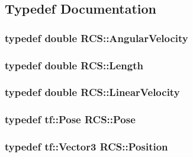 \subsection{Typedef Documentation}
\hypertarget{namespaceRCS_a3ca212cf7a0c547f5496352e850372a9}{
\subsubsection[{Angular\-Velocity}]{\setlength{\rightskip}{0pt plus 5cm}typedef double {\bf R\-C\-S\-::\-Angular\-Velocity}}}\label{namespaceRCS_a3ca212cf7a0c547f5496352e850372a9}
\hypertarget{namespaceRCS_a86ac9427c1a3f2ec2b94a74888b2cefd}{
\subsubsection[{Length}]{\setlength{\rightskip}{0pt plus 5cm}typedef double {\bf R\-C\-S\-::\-Length}}}\label{namespaceRCS_a86ac9427c1a3f2ec2b94a74888b2cefd}
\hypertarget{namespaceRCS_a20e104cd075c4ca08a073a6261a70a84}{
\subsubsection[{Linear\-Velocity}]{\setlength{\rightskip}{0pt plus 5cm}typedef double {\bf R\-C\-S\-::\-Linear\-Velocity}}}\label{namespaceRCS_a20e104cd075c4ca08a073a6261a70a84}
\hypertarget{namespaceRCS_aa07e45d8a50e30064283d2b38087f999}{
\subsubsection[{Pose}]{\setlength{\rightskip}{0pt plus 5cm}typedef tf\-::\-Pose {\bf R\-C\-S\-::\-Pose}}}\label{namespaceRCS_aa07e45d8a50e30064283d2b38087f999}
\hypertarget{namespaceRCS_a6080060b617affc23ab1d6309fe7c3cd}{
\subsubsection[{Position}]{\setlength{\rightskip}{0pt plus 5cm}typedef tf\-::\-Vector3 {\bf R\-C\-S\-::\-Position}}}\label{namespaceRCS_a6080060b617affc23ab1d6309fe7c3cd}
